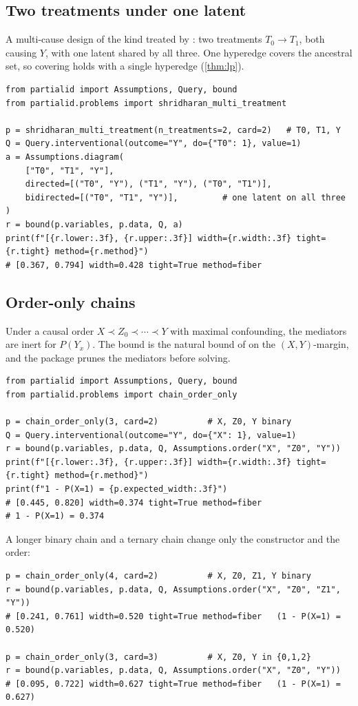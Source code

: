 \subsection{Two treatments under one latent}
\label{app:code-multi}

A multi-cause design of the kind treated by \citet{shridharan2023scalable}: two
treatments $T_0\to T_1$, both causing $Y$, with one latent shared by all three.
One hyperedge covers the ancestral set, so covering holds with a single hyperedge (\cref{thm:lp}).
\begin{lstlisting}
from partialid import Assumptions, Query, bound
from partialid.problems import shridharan_multi_treatment

p = shridharan_multi_treatment(n_treatments=2, card=2)   # T0, T1, Y
Q = Query.interventional(outcome="Y", do={"T0": 1}, value=1)
a = Assumptions.diagram(
    ["T0", "T1", "Y"],
    directed=[("T0", "Y"), ("T1", "Y"), ("T0", "T1")],
    bidirected=[("T0", "T1", "Y")],         # one latent on all three
)
r = bound(p.variables, p.data, Q, a)
print(f"[{r.lower:.3f}, {r.upper:.3f}] width={r.width:.3f} tight={r.tight} method={r.method}")
# [0.367, 0.794] width=0.428 tight=True method=fiber
\end{lstlisting}

\subsection{Order-only chains}
\label{app:code-chains}

Under a causal order $X\prec Z_0\prec\cdots\prec Y$ with maximal confounding,
the mediators are inert for $P(Y_x)$. The bound is the natural bound of
\citet{manski1990nonparametric} on the $(X,Y)$-margin, and the package prunes
the mediators before solving.
\begin{lstlisting}
from partialid import Assumptions, Query, bound
from partialid.problems import chain_order_only

p = chain_order_only(3, card=2)          # X, Z0, Y binary
Q = Query.interventional(outcome="Y", do={"X": 1}, value=1)
r = bound(p.variables, p.data, Q, Assumptions.order("X", "Z0", "Y"))
print(f"[{r.lower:.3f}, {r.upper:.3f}] width={r.width:.3f} tight={r.tight} method={r.method}")
print(f"1 - P(X=1) = {p.expected_width:.3f}")
# [0.445, 0.820] width=0.374 tight=True method=fiber
# 1 - P(X=1) = 0.374
\end{lstlisting}
A longer binary chain and a ternary chain change only the constructor and the
order:
\begin{lstlisting}
p = chain_order_only(4, card=2)          # X, Z0, Z1, Y binary
r = bound(p.variables, p.data, Q, Assumptions.order("X", "Z0", "Z1", "Y"))
# [0.241, 0.761] width=0.520 tight=True method=fiber   (1 - P(X=1) = 0.520)

p = chain_order_only(3, card=3)          # X, Z0, Y in {0,1,2}
r = bound(p.variables, p.data, Q, Assumptions.order("X", "Z0", "Y"))
# [0.095, 0.722] width=0.627 tight=True method=fiber   (1 - P(X=1) = 0.627)
\end{lstlisting}

